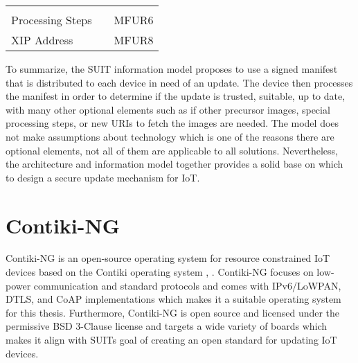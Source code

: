 \documentclass[0-thesis.tex]{subfiles}
\begin{document}
\begin{longtable}[]{@{}lll@{}}
\begin{minipage}[t]{0.23\columnwidth}
    \end{minipage}\tabularnewline
    \begin{minipage}[t]{0.32\columnwidth}\raggedright\strut Processing Steps\strut
    \end{minipage} & \begin{minipage}[t]{0.36\columnwidth}\raggedright\strut
    \strut
    \end{minipage} & \begin{minipage}[t]{0.23\columnwidth}\raggedright\strut MFUR6\strut
    \end{minipage}\tabularnewline
    \begin{minipage}[t]{0.32\columnwidth}\raggedright\strut XIP Address\strut
    \end{minipage} & \begin{minipage}[t]{0.36\columnwidth}\raggedright\strut
    \strut
    \end{minipage} & \begin{minipage}[t]{0.23\columnwidth}\raggedright\strut MFUR8\strut
    \end{minipage}\tabularnewline
    \bottomrule
\end{longtable}


To summarize, the SUIT information model proposes to use a signed manifest that is
distributed to each device in need of an update. The device then processes the manifest in
order to determine if the update is trusted, suitable, up to date, with many other
optional elements such as if other precursor images, special processing steps, or new URIs
to fetch the images are needed. The model does not make assumptions about technology which
is one of the reasons there are optional elements, not all of them are applicable to all
solutions. Nevertheless, the architecture and information model together provides a solid
base on which to design a secure update mechanism for IoT.

\section{Contiki-NG}
\label{ssec:contiki-ng}
Contiki-NG is an open-source operating system for resource constrained IoT devices based
on the Contiki operating system \parencite{contiki-ng-github}, \parencite{contiki-github}.
Contiki-NG focuses on low-power communication and standard protocols and comes with
IPv6/LoWPAN, DTLS, and CoAP implementations which makes it a suitable operating system for
this thesis. Furthermore, Contiki-NG is open source and licensed under the permissive BSD
3-Clause license and targets a wide variety of boards which makes it align with SUITs goal
of creating an open standard for updating IoT devices.
\end{document}
